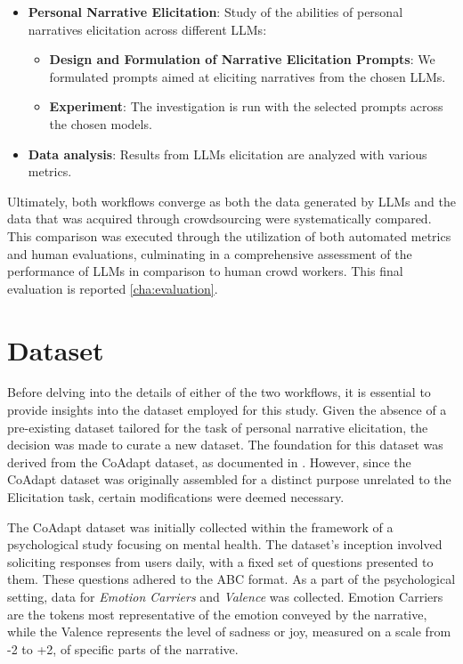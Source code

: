 \begin{itemize}
\begin{itemize}
\begin{itemize}
            \end{itemize}
            \item \textbf{Personal Narrative Elicitation}: Study of the abilities of personal narratives elicitation across different LLMs:
            \begin{itemize}
                \item \textbf{Design and Formulation of Narrative Elicitation Prompts}: We formulated prompts aimed at eliciting narratives from the chosen LLMs.
                \item \textbf{Experiment}: The investigation is run with the selected prompts across the chosen models.
            \end{itemize}
            \item \textbf{Data analysis}: Results from LLMs elicitation are analyzed with various metrics.
        \end{itemize}
\end{itemize}
Ultimately, both workflows converge as both the data generated by LLMs and the data that was acquired through crowdsourcing were systematically compared. This comparison was executed through the utilization of both automated metrics and human evaluations, culminating in a comprehensive assessment of the performance of LLMs in comparison to human crowd workers. This final evaluation is reported \ref{cha:evaluation}.
\section{Dataset}
Before delving into the details of either of the two workflows, it is essential to provide insights into the dataset employed for this study. Given the absence of a pre-existing dataset tailored for the task of personal narrative elicitation, the decision was made to curate a new dataset. The foundation for this dataset was derived from the CoAdapt dataset, as documented in \cite{coadapt}. However, since the CoAdapt dataset was originally assembled for a distinct purpose unrelated to the Elicitation task, certain modifications were deemed necessary.

The CoAdapt dataset was initially collected within the framework of a psychological study focusing on mental health. The dataset's inception involved soliciting responses from users daily, with a fixed set of questions presented to them. These questions adhered to the ABC format. As a part of the psychological setting, data for \emph{Emotion Carriers} and \emph{Valence} was collected. Emotion Carriers are the tokens most representative of the emotion conveyed by the narrative, while the Valence represents the level of sadness or joy, measured on a scale from -2 to +2, of specific parts of the narrative. 

